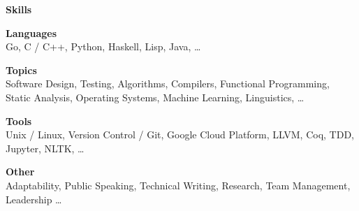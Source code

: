 \documentclass[11pt,a4paper,sans]{article}
\newcommand{\cvcolor}[1]{{\color{MidnightBlue}#1}}
\renewcommand{\section}[1]{
  \cvcolor{\noindent \textbf{\LARGE #1}}
  \vspace{.5em}\\
}
\renewcommand{\subsection}[1]{
  \cvcolor{\noindent \textbf{\large #1} \dotfill}
  \\
}
\begin{document}
\section{Skills}
\vspace{-2.5em}
\begin{multicols}{2}
  \subsection{Languages}
  Go, C / C++, Python, Haskell, Lisp, Java, \ldots

  \subsection{Topics}
  Software Design, Testing, Algorithms, Compilers, Functional Programming,
  Static Analysis, Operating Systems, Machine Learning, Linguistics, \ldots

  \vfill\null
  \columnbreak

  \subsection{Tools}
  Unix / Linux, Version Control / Git, Google Cloud Platform, LLVM, Coq,
  TDD, Jupyter, NLTK, \ldots

  \subsection{Other}
  Adaptability, Public Speaking, Technical Writing, Research, Team Management,
  Leadership \ldots
\end{multicols}

\vspace{-1em}
\end{document}
